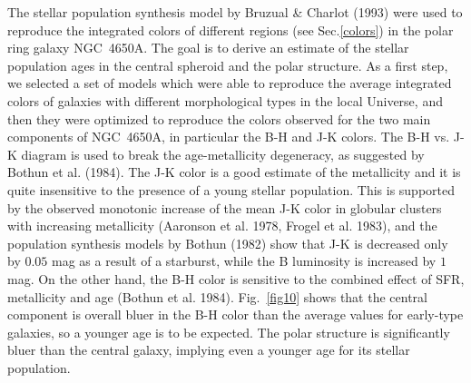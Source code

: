 \documentclass[preprint]{aastex}
\begin{document}
The stellar population synthesis model by Bruzual \& Charlot (1993) 
were used to reproduce the integrated colors of different regions 
(see Sec.\ref{colors}) in the polar ring galaxy NGC~4650A. The goal is to 
derive an estimate of the stellar population ages in the central spheroid 
and the polar structure.
As a first step, we selected a set of models which were able to reproduce 
the average integrated colors of galaxies with different morphological 
types in the local Universe, and then they were optimized to reproduce the 
colors observed for the two main components of NGC~4650A, in particular
the B-H and J-K colors. 
The B-H vs. J-K diagram is used to break the age-metallicity degeneracy, 
as suggested by Bothun et al. (1984). The J-K color is a good estimate 
of the metallicity and it is quite insensitive to the presence of a young 
stellar population. This is supported by the observed monotonic increase 
of the mean J-K color in globular clusters with increasing metallicity 
(Aaronson et al. 1978, Frogel et al. 1983), and the 
population synthesis models by Bothun (1982) show that
J-K is decreased only by $0.05$ mag as a result of a starburst,
while the B luminosity is increased by $1$ mag. On the other hand,
the B-H color is sensitive to the combined effect of SFR, metallicity and 
age (Bothun et al. 1984).
Fig.~\ref{fig10} shows that the central component is
overall bluer in the B-H color than the average values for early-type galaxies, so
a younger age is to be expected. 
The polar structure is significantly bluer than the central galaxy, 
implying even a younger age for its stellar population. 
\end{document}

